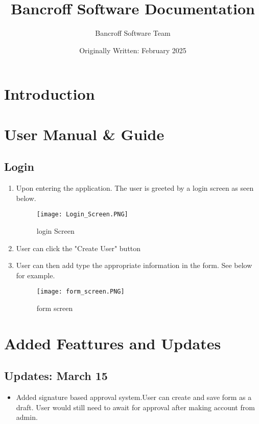 \documentclass{article}
\title{Bancroff Software Documentation}
\author{Bancroff Software Team}
\date{Originally Written: February 2025}
\begin{document}
\maketitle

\section{Introduction}

\section{User Manual \& Guide}
    \subsection{Login}
        \begin{enumerate}
            \item Upon entering the application. The user is greeted by a login screen as seen below.
                \begin{figure}[h]
                \centering
                \texttt{[image: Login\_Screen.PNG]}
                \caption{login Screen}
                \end{figure}
            \item User can click the "Create User" button
            \item User can then add type the appropriate information in the form. See below for example.
                \begin{figure}[h]
                \centering
                \texttt{[image: form\_screen.PNG]}
                \caption{form screen}
                \end{figure}
        \end{enumerate}
    \section{Added Feattures and Updates}
        \subsection{Updates: March 15}
            \begin{itemize}
                \item
                    Added signature based approval system.User can create and save form as a draft.
                    User would still need to await for approval after making account from admin.
            \end{itemize}
\end{document}
